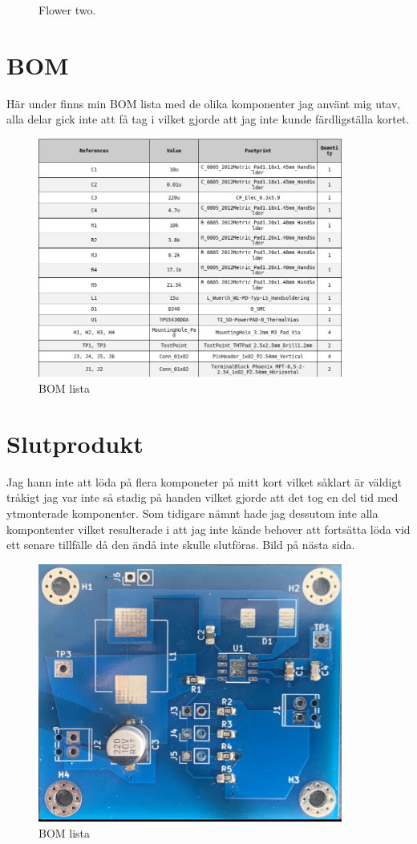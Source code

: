 \documentclass{article}
\begin{document}
\begin{figure}[htp]
\begin{minipage}[b]{0.4\textwidth}
    \caption{Flower two.}
  \end{minipage}
\end{figure}



\section{BOM}

Här under finns min BOM lista med de olika komponenter jag använt mig utav, alla delar gick
inte att få tag i vilket gjorde att jag inte kunde färdligställa kortet.

\begin{figure}[htp]
\centering
\includegraphics[width=10cm]{img/bom.png}
\caption{BOM lista}
\end{figure}

\section{Slutprodukt}
Jag hann inte att löda på flera komponeter på mitt kort vilket såklart är väldigt tråkigt
jag var inte så stadig på handen vilket gjorde att det tog en del tid med ytmonterade 
komponenter. Som tidigare nämnt hade jag dessutom inte alla kompontenter vilket resulterade
i att jag inte kände behover att fortsätta löda vid ett senare tillfälle då den ändå 
inte skulle slutföras.
Bild på nästa sida.

\begin{figure}[htp]
\centering
\includegraphics[width=10cm]{img/irlkort.jpeg}
\caption{BOM lista}
\end{figure}
\end{document}
